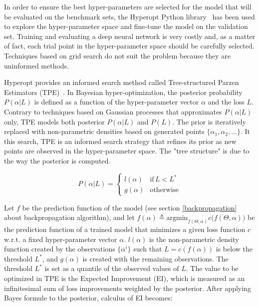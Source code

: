   In order to ensure the best hyper-parameters are selected for the model that will be evaluated
  on the benchmark sets, the Hyperopt Python library~\cite{Bergstra_2015} has been used to explore
  the hyper-parameter space and fine-tune the model on the validation set.
  Training and evaluating a deep neural network is very costly and, as a matter of fact,
  each trial point in the hyper-parameter space should be carefully selected. Techniques based
  on grid search do not suit the problem because they are uninformed methods.

  Hyperopt provides an informed search method called Tree-structured Parzen Estimators (TPE)~\cite{bergstra2011algorithms}.
  In Bayesian hyper-optimization, the posterior probability $P(\alpha \vert L)$ is defined as a function
  of the hyper-parameter vector $\alpha$ and the loss $L$. Contrary to techniques based on Gaussian processes
  that approximates $P(\alpha \vert L)$ only, TPE models both posterior $P(\alpha \vert L)$ and $P(L)$.
  The prior is iteratively replaced with non-parametric densities based on generated points $\{ \alpha_1, \alpha_2, \dotsc \}$.
  It this search, TPE is an informed search strategy that refines its prior as new points are observed in the
  hyper-parameter space. The "tree structure" is due to the way the posterior is computed.

  \begin{equation}
    P(\alpha \vert L) =
      \begin{cases}
        l(\alpha) &  \text{if} \, L < L^* \\
        g(\alpha) &  \text{otherwise}
      \end{cases}
  \end{equation}

  Let $f$ be the prediction function of the model (see section \ref{backpropagation} about backpropagation algorithm),
  and let $f(\alpha) \triangleq \text{argmin}_{f(\Theta, \alpha)} c\big(f(\Theta, \alpha)\big)$ be the prediction function
  of a trained model that minimizes a given loss function $c$ w.r.t. a fixed hyper-parameter vector $\alpha$.
  $l(\alpha)$ is the non-parametric density function created by the observations $\{ \alpha^{i} \}$ such that
  $L = c(f(\alpha))$ is below the threshold $L^*$, and $g(\alpha)$ is created with the remaining observations.
  The threshold $L^*$ is set as a quantile of the observed values of $L$.
  The value to be optimized in TPE is the Expected Improvement (EI), which is measured as an infinitesimal sum
  of loss improvements weighted by the posterior. After applying Bayes formule to the posterior, calculus of EI becomes:

